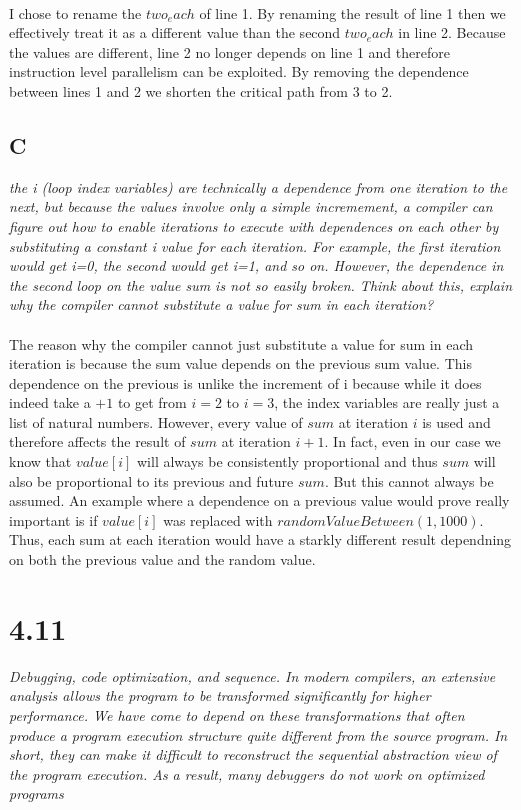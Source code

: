 \documentclass[10pt]{article}
\begin{document}
\paragraph{}I chose to rename the $two_each$ of line 1. By renaming the result of line 1 then we effectively treat it as a different value than the second
$two_each$ in line 2. Because the values are different, line 2 no longer depends on line 1 and therefore instruction level parallelism can be exploited. By 
removing the dependence between lines 1 and 2 we shorten the critical path from 3 to 2. 
\subsection{C}
\textit{the i (loop index variables) are technically a dependence from one iteration to the next,
but because the values involve only a simple incremement, a compiler can figure out
how to enable iterations to execute with dependences on each other by substituting a
constant i value for each iteration. For example, the first iteration would get i=0, the
second would get i=1, and so on. However, the dependence in the second loop on the
value sum is not so easily broken. Think about this, explain why the compiler cannot
substitute a value for sum in each iteration?}
\paragraph{} The reason why the compiler cannot just substitute a value for sum in each iteration is because the sum value depends on 
the previous sum value. This dependence on the previous is unlike the increment of i because while it does indeed take a $+ 1$ to get from $i = 2$ 
to $i = 3$, the index variables are really just a list of natural numbers. However, every value of $sum$ at iteration $i$ is used and therefore affects 
the result of $sum$ at iteration $i + 1$. In fact, even in our case we know that $value[i]$ will always be consistently proportional and thus $sum$ will 
also be proportional to its previous and future $sum$. But this cannot always be assumed. An example where a dependence on a previous value would prove really 
important is if $value[i]$ was replaced with $randomValueBetween(1, 1000)$. Thus, each sum at each iteration would have a starkly different result 
dependning on both the previous value and the random value. 

\section{4.11}
\textit{Debugging, code optimization, and sequence. In modern compilers, an extensive
analysis allows the program to be transformed significantly for higher performance. We
have come to depend on these transformations that often produce a program execution
structure quite different from the source program. In short, they can make it difficult to
reconstruct the sequential abstraction view of the program execution. As a result, many
debuggers do not work on optimized programs}
\end{document}
